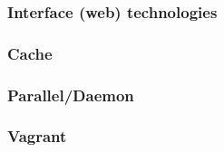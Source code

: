 \subsubsection{Interface (web) technologies}


\subsubsection{Cache}


\subsubsection{Parallel/Daemon}


\subsubsection{Vagrant}

